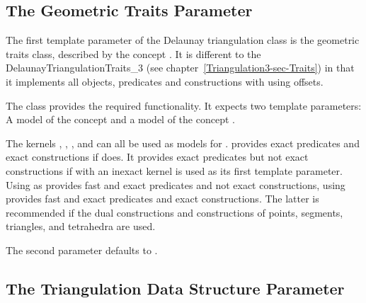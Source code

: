 \subsection{The Geometric Traits Parameter\label{P3Triangulation3-sec-Traits}}
The first template parameter of the Delaunay triangulation class
is the geometric traits class, described by the concept
.  It is different to the
DelaunayTriangulationTraits\_3 (see
chapter~\ref{Triangulation3-sec-Traits}) in that it 
implements all objects, predicates and constructions with
using offsets.

The class 
provides the required functionality. It expects two template
parameters: A model of the concept 
and a model of the concept .

The kernels , ,
,  and
 can all be used as models for
.  provides exact
predicates and exact constructions if  does. It provides
exact predicates but not exact constructions if
 with  an inexact kernel is used as
its first template parameter. Using
 as
 provides fast and exact predicates and not exact constructions,
using  provides
fast and exact predicates and exact constructions. The latter is recommended if
the dual constructions and constructions of points, segments,
triangles, and tetrahedra are used.

The second parameter  defaults to
.

\subsection{The Triangulation Data Structure Parameter\label{P3Triangulation3-sec-tds}}

